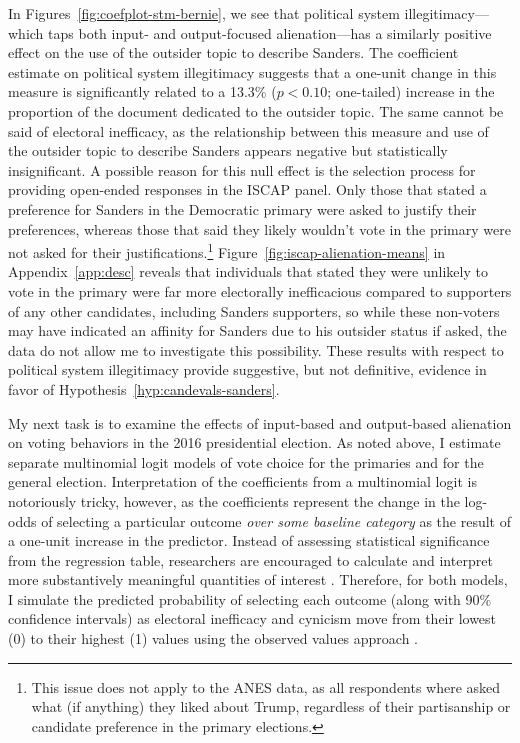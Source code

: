 \documentclass[12pt]{article}
\begin{document}
In Figures~\ref{fig:coefplot-stm-bernie}, we see that political system illegitimacy---which taps both input- and output-focused alienation---has a similarly positive effect on the use of the outsider topic to describe Sanders. The coefficient estimate on political system illegitimacy suggests that a one-unit change in this measure is significantly related to a 13.3\% ($p<0.10$; one-tailed) increase in the proportion of the document dedicated to the outsider topic. The same cannot be said of electoral inefficacy, as the relationship between this measure and use of the outsider topic to describe Sanders appears negative but statistically insignificant. A possible reason for this null effect is the selection process for providing open-ended responses in the ISCAP panel. Only those that stated a preference for Sanders in the Democratic primary were asked to justify their preferences, whereas those that said they likely wouldn't vote in the primary were not asked for their justifications.\footnote{This issue does not apply to the ANES data, as all respondents where asked what (if anything) they liked about Trump, regardless of their partisanship or candidate preference in the primary elections.} Figure~\ref{fig:iscap-alienation-means} in Appendix~\ref{app:desc} reveals that individuals that stated they were unlikely to vote in the primary were far more electorally inefficacious compared to supporters of any other candidates, including Sanders supporters, so while these non-voters may have indicated an affinity for Sanders due to his outsider status if asked, the data do not allow me to investigate this possibility. These results with respect to political system illegitimacy provide suggestive, but not definitive, evidence in favor of Hypothesis~\ref{hyp:candevals-sanders}. 
	
My next task is to examine the effects of input-based and output-based alienation on voting behaviors in the 2016 presidential election. As noted above, I estimate separate multinomial logit models of vote choice for the primaries and for the general election. Interpretation of the coefficients from a multinomial logit is notoriously tricky, however, as the coefficients represent the change in the log-odds of selecting a particular outcome \textit{over some baseline category} as the result of a one-unit increase in the predictor. Instead of assessing statistical significance from the regression table, researchers are encouraged to calculate and interpret more substantively meaningful quantities of interest \parencite{king2000making,paolino2020predicted}. Therefore, for both models, I simulate the predicted probability of selecting each outcome (along with 90\% confidence intervals) as electoral inefficacy and cynicism move from their lowest (0) to their highest (1) values using the observed values approach \parencite{hanmer2013behind}.
\end{document}
